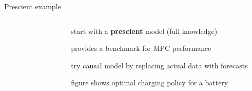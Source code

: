 \documentclass[aspectratio=169,11pt]{beamer}
\begin{document}
\begin{frame}{Prescient example}
\begin{columns}
	\begin{column}{0.65\textwidth}
		\begin{figure}
			\centering
		\end{figure}
	\end{column}
	\begin{column}{0.35\textwidth}
		\BIT
		\item start with a \textbf{prescient} model (full knowledge)
		\item provides a benchmark for MPC performance
		\item try causal model by replacing actual data with forecasts
		\item figure shows optimal charging policy for a battery
		\EIT
	\end{column}
\end{columns}
\end{frame}



	
\end{document}

